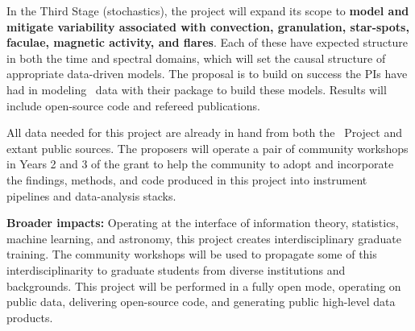 \documentclass[12pt, fullpage, letterpaper]{article}
\begin{document}
In the Third Stage (stochastics), the project will expand its scope to
\textbf{model and mitigate variability associated with convection, granulation,
star-spots, faculae, magnetic activity, and
flares}. Each of these have expected structure in both the time and
spectral domains, which will set the causal structure of appropriate
data-driven models. The proposal is to build on success the PIs have
had in modeling \EPRV\ data with their  package to build these
models. Results will include open-source code and refereed publications.

All data needed for this project are already in hand from both the
\EXPRES\ Project and extant public sources.
The proposers will operate a pair of community workshops in
Years 2 and 3 of the grant to help the community to adopt and
incorporate the findings, methods, and code produced in this project
into instrument pipelines and data-analysis stacks.

\textbf{Broader impacts:}
Operating at the interface of information theory, statistics, machine learning,
and astronomy, this project creates interdisciplinary graduate training.
The community workshops will be used to propagate some of this interdisciplinarity
to graduate students from diverse institutions and backgrounds.
This project will be performed in a fully open mode, operating on
public data, delivering open-source code, and generating public
high-level data products.
\end{document}
